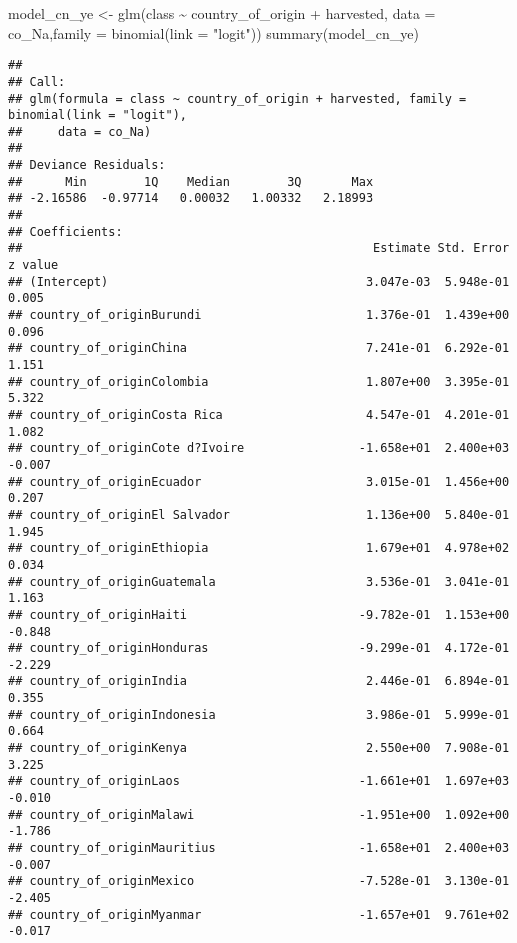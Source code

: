 \documentclass[
]{article}
\newenvironment{Shaded}{\begin{snugshade}}{\end{snugshade}}
\newcommand{\AttributeTok}[1]{\textcolor[rgb]{0.77,0.63,0.00}{#1}}
\newcommand{\FunctionTok}[1]{\textcolor[rgb]{0.00,0.00,0.00}{#1}}
\newcommand{\NormalTok}[1]{#1}
\newcommand{\OtherTok}[1]{\textcolor[rgb]{0.56,0.35,0.01}{#1}}
\newcommand{\SpecialCharTok}[1]{\textcolor[rgb]{0.00,0.00,0.00}{#1}}
\newcommand{\StringTok}[1]{\textcolor[rgb]{0.31,0.60,0.02}{#1}}
\begin{document}
\begin{Shaded}
\begin{Highlighting}[]
\NormalTok{model\_cn\_ye }\OtherTok{\textless{}{-}} \FunctionTok{glm}\NormalTok{(class }\SpecialCharTok{\textasciitilde{}}\NormalTok{ country\_of\_origin }\SpecialCharTok{+}\NormalTok{ harvested, }\AttributeTok{data =}\NormalTok{ co\_Na,}\AttributeTok{family =} \FunctionTok{binomial}\NormalTok{(}\AttributeTok{link =} \StringTok{"logit"}\NormalTok{))}
\FunctionTok{summary}\NormalTok{(model\_cn\_ye)}
\end{Highlighting}
\end{Shaded}

\begin{verbatim}
## 
## Call:
## glm(formula = class ~ country_of_origin + harvested, family = binomial(link = "logit"), 
##     data = co_Na)
## 
## Deviance Residuals: 
##      Min        1Q    Median        3Q       Max  
## -2.16586  -0.97714   0.00032   1.00332   2.18993  
## 
## Coefficients:
##                                                 Estimate Std. Error z value
## (Intercept)                                    3.047e-03  5.948e-01   0.005
## country_of_originBurundi                       1.376e-01  1.439e+00   0.096
## country_of_originChina                         7.241e-01  6.292e-01   1.151
## country_of_originColombia                      1.807e+00  3.395e-01   5.322
## country_of_originCosta Rica                    4.547e-01  4.201e-01   1.082
## country_of_originCote d?Ivoire                -1.658e+01  2.400e+03  -0.007
## country_of_originEcuador                       3.015e-01  1.456e+00   0.207
## country_of_originEl Salvador                   1.136e+00  5.840e-01   1.945
## country_of_originEthiopia                      1.679e+01  4.978e+02   0.034
## country_of_originGuatemala                     3.536e-01  3.041e-01   1.163
## country_of_originHaiti                        -9.782e-01  1.153e+00  -0.848
## country_of_originHonduras                     -9.299e-01  4.172e-01  -2.229
## country_of_originIndia                         2.446e-01  6.894e-01   0.355
## country_of_originIndonesia                     3.986e-01  5.999e-01   0.664
## country_of_originKenya                         2.550e+00  7.908e-01   3.225
## country_of_originLaos                         -1.661e+01  1.697e+03  -0.010
## country_of_originMalawi                       -1.951e+00  1.092e+00  -1.786
## country_of_originMauritius                    -1.658e+01  2.400e+03  -0.007
## country_of_originMexico                       -7.528e-01  3.130e-01  -2.405
## country_of_originMyanmar                      -1.657e+01  9.761e+02  -0.017

\end{verbatim}
\end{document}
